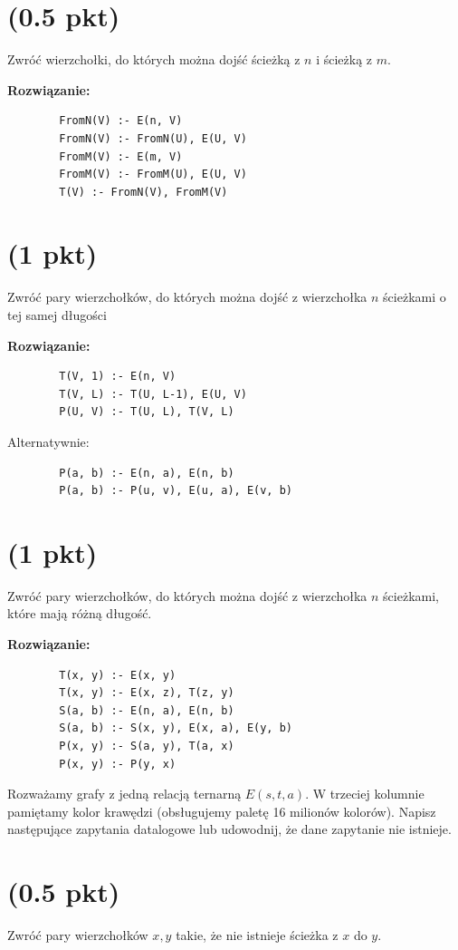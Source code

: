 \documentclass{article}
\begin{document}
\section{(0.5 pkt)} Zwróć wierzchołki, do których można dojść ścieżką z $n$ i ścieżką z $m$.

\textbf{Rozwiązanie:}
\begin{verbatim}
        FromN(V) :- E(n, V)
        FromN(V) :- FromN(U), E(U, V)
        FromM(V) :- E(m, V)
        FromM(V) :- FromM(U), E(U, V)
        T(V) :- FromN(V), FromM(V)
\end{verbatim}

\section{(1 pkt)} Zwróć pary wierzchołków, do których można dojść z wierzchołka $n$ ścieżkami o tej samej długości

\textbf{Rozwiązanie:}
\begin{verbatim}
        T(V, 1) :- E(n, V)
        T(V, L) :- T(U, L-1), E(U, V)
        P(U, V) :- T(U, L), T(V, L)
\end{verbatim}
Alternatywnie:
\begin{verbatim}
        P(a, b) :- E(n, a), E(n, b)
        P(a, b) :- P(u, v), E(u, a), E(v, b)
\end{verbatim}

\section{(1 pkt)} Zwróć pary wierzchołków, do których można dojść z wierzchołka $n$ ścieżkami, które mają różną długość.

\textbf{Rozwiązanie:}
\begin{verbatim}
        T(x, y) :- E(x, y)
        T(x, y) :- E(x, z), T(z, y)
        S(a, b) :- E(n, a), E(n, b)
        S(a, b) :- S(x, y), E(x, a), E(y, b)
        P(x, y) :- S(a, y), T(a, x)
        P(x, y) :- P(y, x)
\end{verbatim}
Rozważamy grafy z jedną relacją ternarną $E(s, t, a)$. W trzeciej kolumnie pamiętamy kolor krawędzi (obsługujemy paletę 16 milionów kolorów). Napisz następujące zapytania datalogowe lub udowodnij, że dane zapytanie nie istnieje.

\section{(0.5 pkt)} Zwróć pary wierzchołków $x,y$ takie, że nie istnieje ścieżka z $x$ do $y$.
\end{document}
